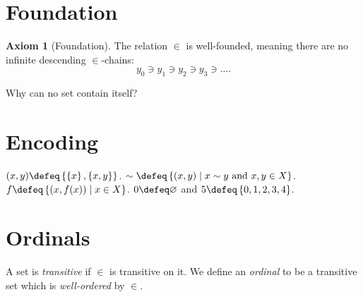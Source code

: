\documentclass[11pt]{scrartcl}
\theoremstyle{definition}
\newtheorem{axiom}{Axiom}
\begin{document}
\section{Foundation}
\begin{axiom}
  [Foundation] The relation $\in$ is well-founded,
  meaning there are no infinite descending $\in$-chains:
  \[ y_0 \ni y_1 \ni y_2 \ni y_3 \ni \dots. \]
\end{axiom}
\begin{ques}
  Why can no set contain itself?
\end{ques}



\section{Encoding}
\begin{itemize}
  \ii $(x,y) \defeq \left\{ \left\{ x \right\}, \left\{ x,y \right\} \right\}$.
  \ii $\sim \defeq \left\{ (x,y) \mid x \sim y \text{ and } x,y \in X \right\}$.
  \ii $f \defeq \left\{ (x, f(x)) \mid x \in X \right\}$.
  \ii $0 \defeq \varnothing$ and $5 \defeq \left\{ 0, 1, 2, 3, 4 \right\}$.
\end{itemize}

\section{Ordinals}
A set is \emph{transitive} if $\in$ is transitive on it.
We define an \emph{ordinal} to be a transitive set which is \emph{well-ordered} by $\in$.
\end{document}
